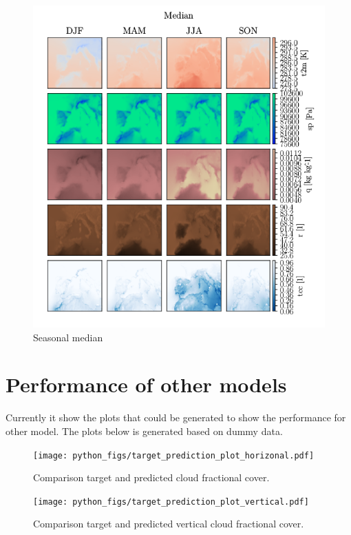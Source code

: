 \begin{figure}[ht]
    \centering
    \includegraphics{python_figs/seasonal_median_all_variables.png}
    \caption{Seasonal median}
    \label{fig:seasonal_median}
\end{figure}

\chapter{Performance of other models}
Currently it show the plots that could be generated to show the performance for other model. The plots below is generated based on dummy data. 

\begin{figure}[ht]
    \centering
    \texttt{[image: python\_figs/target\_prediction\_plot\_horizonal.pdf]}
    \caption{Comparison target and predicted cloud fractional cover.}
    \label{fig:target_predict_horizontal}
\end{figure}

\begin{figure}[ht]
    \centering
    \texttt{[image: python\_figs/target\_prediction\_plot\_vertical.pdf]}
    \caption{Comparison target and predicted vertical cloud fractional cover.}
    \label{fig:target_predict_vertical}
\end{figure}

